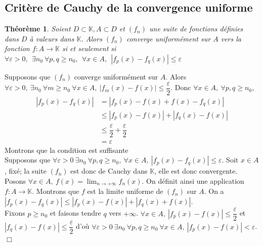 \documentclass[11pt, a4paper]{book}
\newtheorem{teo}{Th\'eor\`eme}[section]
\newenvironment{pr}{\noindent {\bf Preuve} \noindent} {\hfill $\Box$\vskip 5mm}
\begin{document}
\subsection{Crit\`ere de Cauchy de la convergence uniforme}
\begin{teo} \label{teo4.3.1} Soient $D \subset \mathbb{K}, A \subset D$ et $(f_n)$ une suite de fonctions d\'efinies dans $D$ \`a valeurs dans $ \mathbb{K}$. Alors $(f_n)$ converge uniform\'ement sur $A$ vers la fonction $f: A \longrightarrow \mathbb{K}$ si et seulement si $ \forall \varepsilon>0, ~~\exists n_0~\forall p,q\geq n_0, ~~\forall x\in A,~~|f_p(x)-f_q(x)|\leq \varepsilon$
\end{teo}
\begin{pr} \quad

Supposons que $(f_n)$ converge uniform\'ement sur $A$. Alors $\forall \varepsilon>0,~\exists n_0~\forall m\geq n_0 ~\forall x\in A, ~|f_m(x)-f(x)|\leq \dfrac{\varepsilon}{2}$. Donc $\forall x\in A,~\forall p,q\geq n_0$, \begin{align*} |f_p(x)-f_q(x)|&=|f_p(x)-f(x)+f(x)-f_q(x)|\\ &\leq |f_p(x)-f(x)| +|f_q(x)-f(x)|\\ &\leq \dfrac{\varepsilon}{2}+\dfrac{\varepsilon}{2}\\&=\varepsilon \end{align*}
Montrons que la condition est suffisante\\

Supposons que $ \forall \varepsilon>0~\exists n_0 ~\forall p,q\geq n_0,~\forall x\in A,~|f_p(x)-f_q(x)|\leq \varepsilon.$ Soit $x\in A$, fix\'e; la suite $(f_n)$ est donc de Cauchy dans $ \mathbb{K}$, elle est donc convergente. Posons $ \forall x\in A,~{\displaystyle f(x)=\lim_{n\rightarrow+\infty}f_n(x).}$ On d\'efinit ainsi une application $ f:A\longrightarrow \mathbb{K}.$ Montrons que $f$ est la limite uniforme de $(f_n)$ sur $A$.  On a $|f_p(x)-f_q(x)|\leq |f_p(x)-f(x)|+|f_q(x)+f(x)|.$ \\ Fixons $p\geq n_0$ et faisons tendre $q$ vers $+\infty$. $ \forall x\in A, ~|f_p(x)-f(x)|\leq \dfrac{\varepsilon}{2}$ et $|f_q(x)-f(x)|\leq \dfrac{\varepsilon}{2}$ d'o\`u $ \forall \varepsilon >0~\exists n_0~\forall p,q\geq n_0~\forall x\in A,~|f_p(x)-f(x)|<\varepsilon$.
\end{pr}
\end{document}
